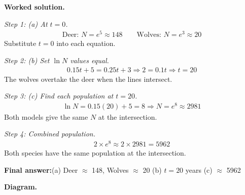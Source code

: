 \documentclass[11pt]{article}
\begin{document}
\textbf{Worked solution.}

\textit{Step 1: (a) At \( t = 0 \).}
\[\begin{gathered}
\text{Deer: } N = e^5 \approx 148 \qquad \text{Wolves: } N = e^3 \approx 20
\end{gathered}\]
Substitute \( t = 0 \) into each equation.

\textit{Step 2: (b) Set \( \ln N \) values equal.}
\[\begin{gathered}
0.15t + 5 = 0.25t + 3 \Rightarrow 2 = 0.1t \Rightarrow t = 20
\end{gathered}\]
The wolves overtake the deer when the lines intersect.

\textit{Step 3: (c) Find each population at \( t = 20 \).}
\[\begin{gathered}
\ln N = 0.15(20) + 5 = 8 \Rightarrow N = e^8 \approx 2981
\end{gathered}\]
Both models give the same \( N \) at the intersection.

\textit{Step 4: Combined population.}
\[\begin{gathered}
2 \times e^8 \approx 2 \times 2981 = 5962
\end{gathered}\]
Both species have the same population at the intersection.

\begin{answerbox}
\textbf{Final answer:}\quad (a) Deer $\approx$ 148, Wolves $\approx$ 20 \quad  (b) \(\displaystyle  t = 20 \) years \quad  (c) $\approx$ 5962
\end{answerbox}
\textbf{Diagram.}
\end{document}
